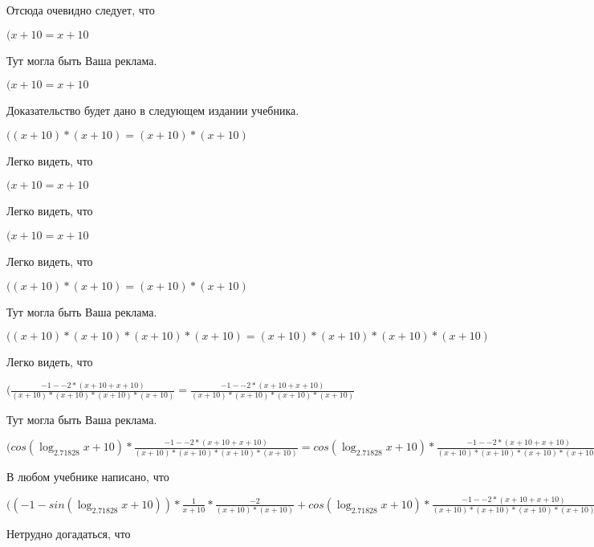 \documentclass[12pt,a4paper,fleqn]{article}
\theoremstyle{definition}
\begin{document}
Отсюда очевидно следует, что

$( x  +  10  =  x  +  10 $

Тут могла быть Ваша реклама.

$( x  +  10  =  x  +  10 $

Доказательство будет дано в следующем издании учебника.

$(( x  +  10 ) * ( x  +  10 ) = ( x  +  10 ) * ( x  +  10 )$

Легко видеть, что

$( x  +  10  =  x  +  10 $

Легко видеть, что

$( x  +  10  =  x  +  10 $

Легко видеть, что

$(( x  +  10 ) * ( x  +  10 ) = ( x  +  10 ) * ( x  +  10 )$

Тут могла быть Ваша реклама.

$(( x  +  10 ) * ( x  +  10 ) * ( x  +  10 ) * ( x  +  10 ) = ( x  +  10 ) * ( x  +  10 ) * ( x  +  10 ) * ( x  +  10 )$

Легко видеть, что

$(\frac{ -1  -  -2  * ( x  +  10  +  x  +  10 )}{( x  +  10 ) * ( x  +  10 ) * ( x  +  10 ) * ( x  +  10 )}
 = \frac{ -1  -  -2  * ( x  +  10  +  x  +  10 )}{( x  +  10 ) * ( x  +  10 ) * ( x  +  10 ) * ( x  +  10 )}
$

Тут могла быть Ваша реклама.

$(cos(\log_{ 2.71828 }{ x  +  10 }) * \frac{ -1  -  -2  * ( x  +  10  +  x  +  10 )}{( x  +  10 ) * ( x  +  10 ) * ( x  +  10 ) * ( x  +  10 )}
 = cos(\log_{ 2.71828 }{ x  +  10 }) * \frac{ -1  -  -2  * ( x  +  10  +  x  +  10 )}{( x  +  10 ) * ( x  +  10 ) * ( x  +  10 ) * ( x  +  10 )}
$

В любом учебнике написано, что

$(( -1  - sin(\log_{ 2.71828 }{ x  +  10 })) * \frac{ 1 }{ x  +  10 }
 * \frac{ -2 }{( x  +  10 ) * ( x  +  10 )}
 + cos(\log_{ 2.71828 }{ x  +  10 }) * \frac{ -1  -  -2  * ( x  +  10  +  x  +  10 )}{( x  +  10 ) * ( x  +  10 ) * ( x  +  10 ) * ( x  +  10 )}
 = ( -1  - sin(\log_{ 2.71828 }{ x  +  10 })) * \frac{ 1 }{ x  +  10 }
 * \frac{ -2 }{( x  +  10 ) * ( x  +  10 )}
 + cos(\log_{ 2.71828 }{ x  +  10 }) * \frac{ -1  -  -2  * ( x  +  10  +  x  +  10 )}{( x  +  10 ) * ( x  +  10 ) * ( x  +  10 ) * ( x  +  10 )}
$

Нетрудно догадаться, что
\end{document}
